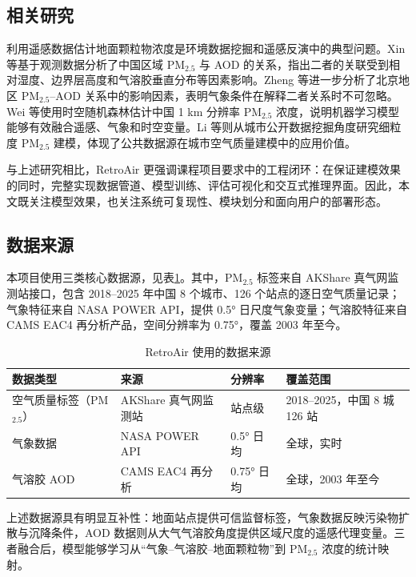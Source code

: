 ﻿\documentclass[UTF8,zihao=-4,a4paper]{ctexart}
\newcommand{\pmfine}{PM$_{2.5}$}
\newcommand{\aod}{AOD}
\begin{document}
\subsection{相关研究}

利用遥感数据估计地面颗粒物浓度是环境数据挖掘和遥感反演中的典型问题。Xin 等\cite{xin2016}基于观测数据分析了中国区域 \pmfine{} 与 \aod{} 的关系，指出二者的关联受到相对湿度、边界层高度和气溶胶垂直分布等因素影响。Zheng 等\cite{zheng2017}进一步分析了北京地区 \pmfine{}--\aod{} 关系中的影响因素，表明气象条件在解释二者关系时不可忽略。Wei 等\cite{wei2019}使用时空随机森林估计中国 1 km 分辨率 \pmfine{} 浓度，说明机器学习模型能够有效融合遥感、气象和时空变量。Li 等\cite{li2017}则从城市公开数据挖掘角度研究细粒度 \pmfine{} 建模，体现了公共数据源在城市空气质量建模中的应用价值。

与上述研究相比，RetroAir 更强调课程项目要求中的工程闭环：在保证建模效果的同时，完整实现数据管道、模型训练、评估可视化和交互式推理界面。因此，本文既关注模型效果，也关注系统可复现性、模块划分和面向用户的部署形态。

\subsection{数据来源}

本项目使用三类核心数据源，见表\ref{tab:data_source}。其中，\pmfine{} 标签来自 AKShare 真气网监测站接口，包含 2018--2025 年中国 8 个城市、126 个站点的逐日空气质量记录；气象特征来自 NASA POWER API，提供 0.5° 日尺度气象变量；气溶胶特征来自 CAMS EAC4 再分析产品，空间分辨率为 0.75°，覆盖 2003 年至今。

\begin{table}[H]
  \centering
  \caption{RetroAir 使用的数据来源}
  \label{tab:data_source}
  \small
  \begin{tabularx}{\textwidth}{lllX}
    \toprule
    数据类型 & 来源 & 分辨率 & 覆盖范围 \\
    \midrule
    空气质量标签（\pmfine{}） & AKShare 真气网监测站 & 站点级 & 2018--2025，中国 8 城 126 站 \\
    气象数据 & NASA POWER API & 0.5° 日均 & 全球，实时 \\
    气溶胶 \aod{} & CAMS EAC4 再分析 & 0.75° 日均 & 全球，2003 年至今 \\
    \bottomrule
  \end{tabularx}
\end{table}

上述数据源具有明显互补性：地面站点提供可信监督标签，气象数据反映污染物扩散与沉降条件，\aod{} 数据则从大气气溶胶角度提供区域尺度的遥感代理变量。三者融合后，模型能够学习从“气象--气溶胶--地面颗粒物”到 \pmfine{} 浓度的统计映射。
\end{document}
